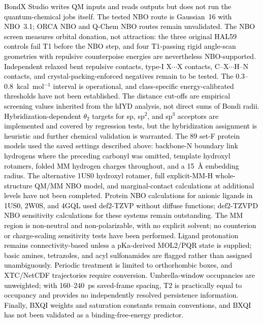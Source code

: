 \documentclass[journal=jcisd8,manuscript=article,layout=two-column]{achemso}
\newcommand{\tcb}[1]{{\textcolor{black}{#1}}}
\begin{document}
\tcb{BondX Studio writes QM inputs and reads outputs but does not run the quantum-chemical jobs itself. The tested NBO route is Gaussian~16 with NBO~3.1; ORCA NBO and Q-Chem NBO routes remain unvalidated. The NBO screen measures orbital donation, not attraction: the three original HAL59 controls fail T1 before the NBO step, and four T1-passing rigid angle-scan geometries with repulsive counterpoise energies are nevertheless NBO-supported. Independent relaxed bent repulsive contacts, type-I X$\cdots$X contacts, C--X$\cdots$H--N contacts, and crystal-packing-enforced negatives remain to be tested. The 0.3--0.8~kcal~mol$^{-1}$ interval is operational, and class-specific energy-calibrated thresholds have not been established. The distance cut-offs are empirical screening values inherited from the hIYD analysis, not direct sums of Bondi radii. Hybridization-dependent $\theta_2$ targets for sp, sp$^2$, and sp$^3$ acceptors are implemented and covered by regression tests, but the hybridization assignment is heuristic and further chemical validation is warranted. The 89 set-F protein models used the saved settings described above: backbone-N boundary link hydrogens where the preceding carbonyl was omitted, template hydroxyl rotamers, folded MM hydrogen charges throughout, and a 15~\AA{} embedding radius. The alternative 1US0 hydroxyl rotamer, full explicit-MM-H whole-structure QM/MM NBO model, and marginal-contact calculations at additional levels have not been completed. Protein NBO calculations for anionic ligands in 1US0, 2W0S, and 4GQL used def2-TZVP without diffuse functions; def2-TZVPD NBO sensitivity calculations for these systems remain outstanding. The MM region is non-neutral and non-polarizable, with no explicit solvent; no counterion or charge-scaling sensitivity tests have been performed. Ligand protonation remains connectivity-based unless a pKa-derived MOL2/PQR state is supplied; basic amines, tetrazoles, and acyl sulfonamides are flagged rather than assigned unambiguously. Periodic treatment is limited to orthorhombic boxes, and XTC/NetCDF trajectories require conversion. Umbrella-window occupancies are unweighted; with 160--240~ps saved-frame spacing, T2 is practically equal to occupancy and provides no independently resolved persistence information. Finally, BXQI weights and saturation constants remain conventions, and BXQI has not been validated as a binding-free-energy predictor.}

\end{document}
